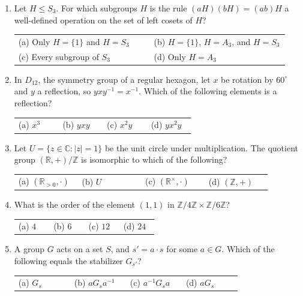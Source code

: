 \documentclass[11pt,letterpaper]{article}
\makeatletter
\newcommand{\Z}{\mathbb Z}
\newcommand{\R}{\mathbb R}
\newcommand{\C}{\mathbb C}
\newif\ifsolutions
\newcommand{\sol}[1]{\ifsolutions\par\smallskip{\color{blue!50!black}\textbf{Answer.} #1}\fi}
\newcommand{\choices}[4]{\par
  \begin{tabular}{@{}p{0.22\linewidth}p{0.22\linewidth}p{0.22\linewidth}p{0.22\linewidth}@{}}
    (a) #1 & (b) #2 & (c) #3 & (d) #4
  \end{tabular}}
\makeatother
\begin{document}
\begin{enumerate}[label=\textbf{A\arabic*.}]
\item Let $H\leq S_3$. For which subgroups $H$ is the rule $(aH)(bH)=(ab)H$ a well-defined operation on the set of left cosets of $H$?
\par\begin{tabular}{@{}p{0.47\linewidth}p{0.47\linewidth}@{}}
(a) Only $H=\{1\}$ and $H=S_3$ & (b) $H=\{1\}$, $H=A_3$, and $H=S_3$\\[3pt]
(c) Every subgroup of $S_3$ & (d) Only $H=A_3$
\end{tabular}
\sol{(b). The rule is well defined exactly when $H\trianglelefteq S_3$. The normal subgroups of $S_3$ are $\{1\}$, $A_3=\langle(1\,2\,3)\rangle$, and $S_3$; the subgroups $\langle(1\,2)\rangle$, $\langle(1\,3)\rangle$, $\langle(2\,3)\rangle$ are not normal.}

\item In $D_{12}$, the symmetry group of a regular hexagon, let $x$ be rotation by $60^\circ$ and $y$ a reflection, so $yxy^{-1}=x^{-1}$. Which of the following elements is a reflection?
\choices{$x^3$}{$yxy$}{$x^2y$}{$yx^2y$}
\sol{(c). Every element of the form $x^ky$ is a reflection. Since $y=y^{-1}$, we have $yxy=x^{-1}$ and $yx^2y=x^{-2}$, which are rotations, and $x^3$ is rotation by $180^\circ$.}

\item Let $U=\{z\in\C:|z|=1\}$ be the unit circle under multiplication. The quotient group $(\R,+)/\Z$ is isomorphic to which of the following?
\choices{$(\R_{>0},\cdot)$}{$U$}{$(\R^\times,\cdot)$}{$(\Z,+)$}
\sol{(b). The map $\varphi:\R\to U$, $\varphi(t)=e^{2\pi i t}$, is a surjective homomorphism from $(\R,+)$ to $U$, because $e^{2\pi i(s+t)}=e^{2\pi i s}e^{2\pi i t}$. Its kernel is $\Z$. By the first isomorphism theorem, $\R/\Z\cong U$.}

\item What is the order of the element $(1,1)$ in $\Z/4\Z\times\Z/6\Z$?
\choices{$4$}{$6$}{$12$}{$24$}
\sol{(c). The element $n(1,1)=(n,n)$ is the identity exactly when $4\mid n$ and $6\mid n$. So the order is $\operatorname{lcm}(4,6)=12$. Every element of this group has order dividing $12$, so the group has no element of order $24$ and is not cyclic. Coprimality fails here: $\gcd(4,6)=2$.}

\item A group $G$ acts on a set $S$, and $s'=a\cdot s$ for some $a\in G$. Which of the following equals the stabilizer $G_{s'}$?
\choices{$G_s$}{$aG_sa^{-1}$}{$a^{-1}G_sa$}{$aG_s$}
\sol{(b). If $g\in G_s$, then $(aga^{-1})\cdot s'=ag\cdot s=a\cdot s=s'$, so $aG_sa^{-1}\subseteq G_{s'}$. Since $s=a^{-1}\cdot s'$, the same argument gives $a^{-1}G_{s'}a\subseteq G_s$. Choice (a) fails in general, for example for $S_3$ acting on $\{1,2,3\}$. Choice (d) is a coset, and it is not a subgroup unless $a\in G_s$.}
\end{enumerate}
\end{document}
